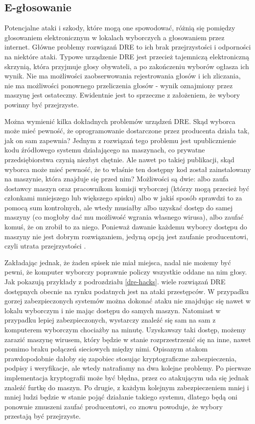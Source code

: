 \documentclass[polish]{kbk}
\begin{document}
\subsection{E-głosowanie}
Potencjalne ataki i szkody, które mogą one spowodować, różnią się pomiędzy głosowaniem elektronicznym w lokalach wyborczych a głosowaniem przez internet. Główne problemy rozwiązań DRE to ich brak przejrzystości i odporności na niektóre ataki. Typowe urządzenie DRE jest przecież tajemniczą elektroniczną skrzynią, która przyjmuje głosy obywateli, a po zakończeniu wyborów ogłasza ich wynik. Nie ma możliwości zaobserwowania rejestrowania głosów i ich zliczania, nie ma możliwości ponownego przeliczenia głosów - wynik oznajmiony przez maszynę jest ostateczny. Ewidentnie jest to sprzeczne z założeniem, że wybory powinny być przejrzyste.

Można wymienić kilka dokładnych problemów urządzeń DRE. Skąd wyborca może mieć pewność, że oprogramowanie dostarczone przez producenta działa tak, jak on sam zapewnia? Jednym z rozwiązań tego problemu jest upublicznienie kodu źródłowego systemu działającego na maszynach, co prywatne przedsiębiorstwa czynią niezbyt chętnie. Ale nawet po takiej publikacji, skąd wyborca może mieć pewność, że to właśnie ten dostępny kod został zainstalowany na maszynie, która znajduje się przed nim? Możliwości są dwie: albo zaufa dostawcy maszyn oraz pracownikom komisji wyborczej (którzy mogą przecież być członkami mniejszego lub większego spisku) albo w jakiś sposób sprawdzi to za pomocą sum kontrolnych, ale wtedy musiałby albo uzyskać dostęp do samej maszyny (co mogłoby dać mu możliwość wgrania własnego wirusa), albo zaufać komuś, że on zrobił to za niego. Ponieważ dawanie każdemu wyborcy dostępu do maszyny nie jest dobrym rozwiązaniem, jedyną opcją jest zaufanie producentowi, czyli utrata przejrzystości \cite{why-hard}.

Zakładając jednak, że żaden spisek nie miał miejsca, nadal nie możemy być pewni, że komputer wyborczy poprawnie policzy wszystkie oddane na nim głosy. Jak pokazują przykłady z podrozdziału \ref{dre-hacks}. wiele rozwiązań DRE dostępnych obecnie na rynku podatnych jest na ataki przestępców. W przypadku gorzej zabezpieczonych systemów można dokonać ataku nie znajdując się nawet w lokalu wyborczym i nie mając dostępu do samych maszyn. Natomiast w przypadku lepiej zabezpieczonych, wystarczy znaleźć się sam na sam z komputerem wyborczym chociażby na minutę. Uzyskawszy taki dostęp, możemy zarazić maszynę wirusem, który będzie w stanie rozprzestrzenić się na inne, nawet pomimo braku połączeń sieciowych między nimi. Opisanym atakom prawdopodobnie dałoby się zapobiec stosując kryptograficzne zabezpieczenia, podpisy i weryfikacje, ale wtedy natrafiamy na dwa kolejne problemy. Po pierwsze implementacja kryptografii może być błędna, przez co atakującym uda się jednak znaleźć furtkę do maszyn. Po drugie, z każdym kolejnym zabezpieczeniem mniej i mniej ludzi będzie w stanie pojąć działanie takiego systemu, dlatego będą oni ponownie zmuszeni zaufać producentowi, co znowu powoduje, że wybory przestają być przejrzyste.
\end{document}
